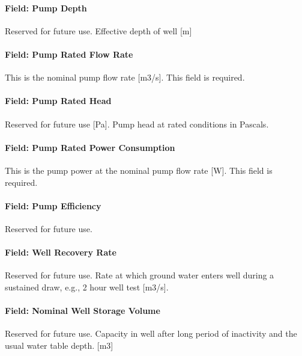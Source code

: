 \paragraph{Field: Pump Depth}\label{field-pump-depth}

Reserved for future use. Effective depth of well {[}m{]}

\paragraph{Field: Pump Rated Flow Rate}\label{field-pump-rated-flow-rate}

This is the nominal pump flow rate {[}m3/s{]}. This field is required.

\paragraph{Field: Pump Rated Head}\label{field-pump-rated-head}

Reserved for future use {[}Pa{]}. Pump head at rated conditions in Pascals.

\paragraph{Field: Pump Rated Power Consumption}\label{field-pump-rated-power-consumption}

This is the pump power at the nominal pump flow rate {[}W{]}. This field is required.

\paragraph{Field: Pump Efficiency}\label{field-pump-efficiency}

Reserved for future use.

\paragraph{Field: Well Recovery Rate}\label{field-well-recovery-rate}

Reserved for future use. Rate at which ground water enters well during a sustained draw, e.g., 2 hour well test {[}m3/s{]}.

\paragraph{Field: Nominal Well Storage Volume}\label{field-nominal-well-storage-volume}

Reserved for future use. Capacity in well after long period of inactivity and the usual water table depth. {[}m3{]}

